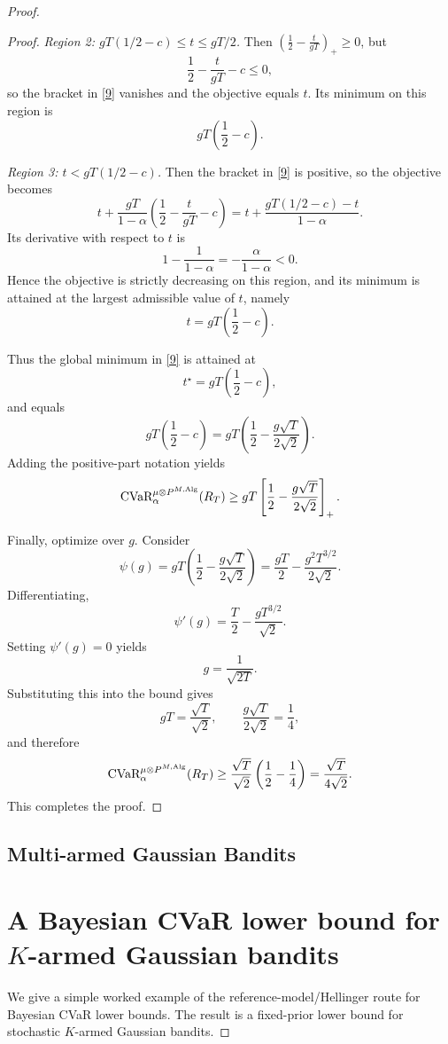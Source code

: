 \documentclass[conference]{IEEEtran}
\begin{document}
\begin{proof}[Proof]
\begin{proof}
\smallskip
\noindent
\emph{Region 2: \(gT(1/2-c)\le t\le gT/2\).}
Then \(\left(\frac12-\frac{t}{gT}\right)_+\ge 0\), but
\[
\frac12-\frac{t}{gT}-c\le 0,
\]
so the bracket in \eqref{9}  vanishes and the objective equals \(t\). Its minimum on this region is
\[
gT\left(\frac12-c\right).
\]

\smallskip
\noindent
\emph{Region 3: \(t<gT(1/2-c)\).}
Then the bracket in \eqref{9} is positive, so the objective becomes
\[
t+\frac{gT}{1-\alpha}\left(\frac12-\frac{t}{gT}-c\right)
=
t+\frac{gT(1/2-c)-t}{1-\alpha}.
\]
Its derivative with respect to \(t\) is
\[
1-\frac{1}{1-\alpha}
=
-\frac{\alpha}{1-\alpha}<0.
\]
Hence the objective is strictly decreasing on this region, and its minimum is attained at the largest admissible value of \(t\), namely
\[
t=gT\left(\frac12-c\right).
\]

\smallskip
Thus the global minimum in \eqref{9} is attained at
\[
t^\star = gT\left(\frac12-c\right),
\]
and equals
\[
gT\left(\frac12-c\right)
=
gT\left(\frac12-\frac{g\sqrt{T}}{2\sqrt{2}}\right).
\]
Adding the positive-part notation yields
\[
\textup{CVaR}_\alpha^{\mu\otimes P^{M,\textup{Alg}}}(R_T)
\ge
gT\left[\frac12-\frac{g\sqrt{T}}{2\sqrt{2}}\right]_+.
\]

Finally, optimize over \(g\). Consider
\[
\psi(g)
=
gT\left(\frac12-\frac{g\sqrt{T}}{2\sqrt{2}}\right)
=
\frac{gT}{2}-\frac{g^2T^{3/2}}{2\sqrt{2}}.
\]
Differentiating,
\[
\psi'(g)=\frac{T}{2}-\frac{gT^{3/2}}{\sqrt{2}}.
\]
Setting \(\psi'(g)=0\) yields
\[
g=\frac{1}{\sqrt{2T}}.
\]
Substituting this into the bound gives
\[
gT=\frac{\sqrt{T}}{\sqrt{2}},
\qquad
\frac{g\sqrt{T}}{2\sqrt{2}}=\frac14,
\]
and therefore
\[
\textup{CVaR}_\alpha^{\mu\otimes P^{M,\textup{Alg}}}(R_T)
\ge
\frac{\sqrt{T}}{\sqrt{2}}\left(\frac12-\frac14\right)
=
\frac{\sqrt{T}}{4\sqrt{2}}.
\]
This completes the proof.
\end{proof}

\fi
\iffalse
\subsection{Multi-armed Gaussian Bandits}
\section{A Bayesian CVaR lower bound for $K$-armed Gaussian bandits}

We give a simple worked example of the reference-model/Hellinger route for Bayesian CVaR lower bounds.
The result is a fixed-prior lower bound for stochastic $K$-armed Gaussian bandits.


\end{proof}
\end{document}
